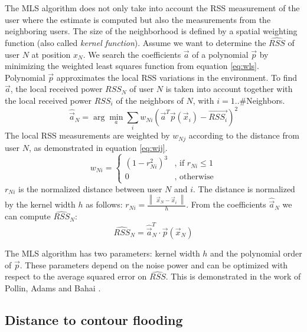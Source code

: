 The MLS algorithm does not only take into account the RSS measurement of the user where the estimate is computed but also the measurements from the neighboring users. The size of the neighborhood is defined by a spatial weighting function (also called \textit{kernel function}). Assume we want to determine the $\hat{RSS}$ of user $N$ at position $x_N$. We search the coefficients $\vec{a}$ of a polynomial $\vec{p}$ by minimizing the weighted least squares function from equation \ref{eq:wls}. Polynomial $\vec{p}$ approximates the local RSS variations in the environment. To find $\vec{a}$, the local received power $RSS_N$ of user $N$ is taken into account together with the local received power $RSS_i$ of the neighbors of $N$, with $i=1..\#$Neighbors.
\begin{equation} \label{eq:wls}
\hat{\vec{a}}_N = \arg \min_a \sum_i w_{Ni}(\vec{a}^T \vec{p}(\vec{x}_i)-\vec{RSS_i})^2
\end{equation}
The local RSS measurements are weighted by $w_{Nj}$ according to the distance from user $N$, as demonstrated in equation \ref{eq:wij}.
\begin{equation} \label{eq:wij}
w_{Ni} = \begin{cases} 
(1-r_{Ni}^2)^3 &  \text{, if $r_{Ni} \leq 1$} \\ 
0 & \text{, otherwise}
\end{cases}
\end{equation}
$r_{Ni}$ is the normalized distance between user $N$ and $i$. The distance is normalized by the kernel width $h$ as follows: $r_{Ni}=\frac{\begin{Vmatrix}\vec{x}_N-\vec{x}_i\end{Vmatrix}}{h}$.
From the coefficients $\hat{\vec{a}}_N$ we can compute $\hat{RSS}_N$:
\begin{equation}
\hat{RSS}_N = \hat{\vec{a}}^T_N \cdot \vec{p}(\vec{x}_N)
\end{equation}

The MLS algorithm has two parameters: kernel width $h$ and the polynomial order of $\vec{p}$. These parameters depend on the noise power and can be optimized with respect to the average squared error on $\hat{RSS}$. This is demonstrated in the work of Pollin, Adams and Bahai \cite{sofie}. 

\subsection{Distance to contour flooding} \label{sec:dtc1}

